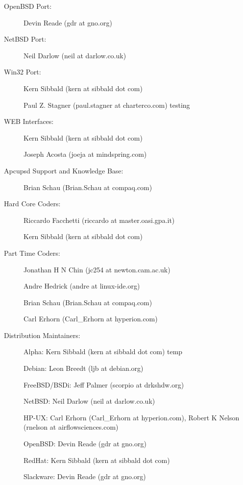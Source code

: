 {{{{{{{{{{{{\begin{description}
\item [OpenBSD Port:]
   Devin Reade (gdr at gno.org)  

\item [NetBSD Port:]
   Neil Darlow (neil at darlow.co.uk)  

\item [Win32 Port:]
   Kern Sibbald (kern at sibbald dot com)  

Paul Z. Stagner (paul.stagner at charterco.com) testing  

\item [WEB Interfaces:]
   Kern Sibbald (kern at sibbald dot com)  

Joseph Acosta (joeja at mindspring.com)  

\item [Apcupsd Support and Knowledge Base:]
   Brian Schau (Brian.Schau at compaq.com)  

\item [Hard Core Coders:]
   Riccardo Facchetti (riccardo at master.oasi.gpa.it)  

Kern Sibbald (kern at sibbald dot com)  

\item [Part Time Coders:]
   Jonathan H N Chin (jc254 at newton.cam.ac.uk)  

Andre Hedrick (andre at linux-ide.org)  

Brian Schau (Brian.Schau at compaq.com)  

Carl Erhorn (Carl\_Erhorn at hyperion.com)  

\item [Distribution Maintainers:]
   Alpha: Kern Sibbald (kern at sibbald dot com) temp  

Debian: Leon Breedt (ljb at debian.org)  

FreeBSD/BSDi: Jeff Palmer (scorpio at drkshdw.org)  

NetBSD: Neil Darlow (neil at darlow.co.uk)  

HP-UX: Carl Erhorn (Carl\_Erhorn at hyperion.com), Robert K Nelson (rnelson at
airflowsciences.com)  

OpenBSD: Devin Reade (gdr at gno.org)  

RedHat: Kern Sibbald (kern at sibbald dot com)  

Slackware: Devin Reade (gdr at gno.org)  


\end{description}}}}}}}}}}}}}
